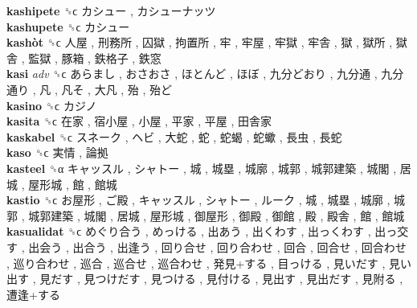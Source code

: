 \textbf{kashipete} ␝ϲ   カシュー ,  カシューナッツ   \\
\textbf{kashupete} ␝ϲ   カシュー   \\
\textbf{kashòt} ␝ϲ   人屋 ,  刑務所 ,  囚獄 ,  拘置所 ,  牢 ,  牢屋 ,  牢獄 ,  牢舎 ,  獄 ,  獄所 ,  獄舎 ,  監獄 ,  豚箱 ,  鉄格子 ,  鉄窓   \\
\textbf{kasi} \emph{adv}  ␝ϲ   あらまし ,  おさおさ ,  ほとんど ,  ほぼ ,  九分どおり ,  九分通 ,  九分通り ,  凡 ,  凡そ ,  大凡 ,  殆 ,  殆ど   \\
\textbf{kasino} ␝ϲ   カジノ   \\
\textbf{kasita} ␝ϲ   在家 ,  宿小屋 ,  小屋 ,  平家 ,  平屋 ,  田舎家   \\
\textbf{kaskabel} ␝ϲ   スネーク ,  ヘビ ,  大蛇 ,  蛇 ,  蛇蝎 ,  蛇蠍 ,  長虫 ,  長蛇   \\
\textbf{kaso} ␝ϲ   実情 ,  論拠   \\
\textbf{kasteel} ␝α   キャッスル ,  シャトー ,  城 ,  城塁 ,  城廓 ,  城郭 ,  城郭建築 ,  城閣 ,  居城 ,  屋形城 ,  館 ,  館城   \\
\textbf{kastio} ␝ϲ   お屋形 ,  ご殿 ,  キャッスル ,  シャトー ,  ルーク ,  城 ,  城塁 ,  城廓 ,  城郭 ,  城郭建築 ,  城閣 ,  居城 ,  屋形城 ,  御屋形 ,  御殿 ,  御館 ,  殿 ,  殿舎 ,  館 ,  館城   \\
\textbf{kasualidat} ␝ϲ   めぐり合う ,  めっける ,  出あう ,  出くわす ,  出っくわす ,  出っ交す ,  出会う ,  出合う ,  出逢う ,  回り合せ ,  回り合わせ ,  回合 ,  回合せ ,  回合わせ ,  巡り合わせ ,  巡合 ,  巡合せ ,  巡合わせ ,  発見+する ,  目っける ,  見いだす ,  見い出す ,  見だす ,  見つけだす ,  見つける ,  見付ける ,  見出す ,  見出だす ,  見附る ,  遭逢+する   \\
